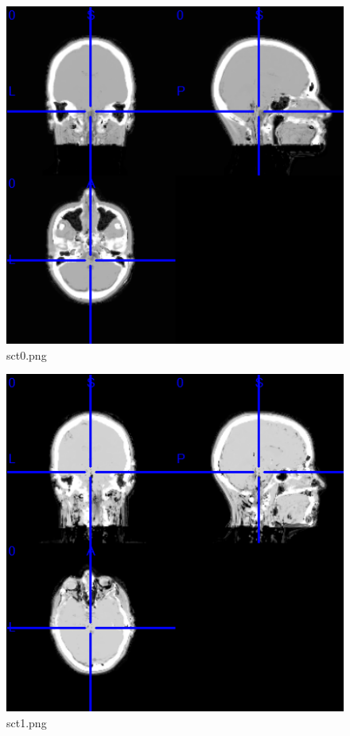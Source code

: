 \begin{figure}
\includegraphics[width=\linewidth]{sct0.png}
\caption{sct0.png}
\end{figure}

\begin{figure}
\includegraphics[width=\linewidth]{sct1.png}
\caption{sct1.png}
\end{figure}

